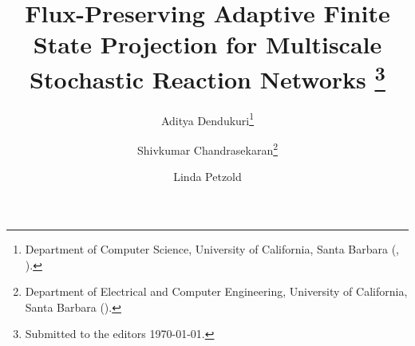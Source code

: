 

\usepackage{lipsum}
\usepackage{amsfonts}
\usepackage{graphicx}
\usepackage{epstopdf}
\usepackage{algorithmic}
\ifpdf
\else
\fi

\newcommand{\creflastconjunction}{, and~}





\title{Flux-Preserving Adaptive Finite State Projection for Multiscale Stochastic Reaction Networks
\thanks{Submitted to the editors \today.}}

\author{Aditya Dendukuri\thanks{Department of Computer Science, University of California, Santa Barbara
  (, ).}
\and Shivkumar Chandrasekaran\thanks{Department of Electrical and Computer Engineering, University of California, Santa Barbara 
  ().}
\and Linda Petzold\footnotemark[2]}


\usepackage{amsopn}
\DeclareMathOperator{\diag}{diag}


\makeatletter
\newcommand*{\addFileDependency}[1]{%
  \typeout{(#1)}%
  \@addtofilelist{#1}%
  \IfFileExists{#1}{}{\typeout{No file #1.}}%
}
\makeatother

\newcommand*{\myexternaldocument}[1]{%
    \addFileDependency{#1.tex}%
    \addFileDependency{#1.aux}%
}

